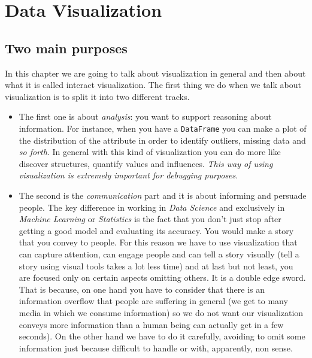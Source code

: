 

\section{Data Visualization}
\subsection{Two main purposes}

In this chapter we are going to talk about visualization in general and then about what it is called interact visualization. The first thing we do when we talk about visualization is to split it into two different tracks. 

\begin{itemize}
\item {The first one is about \emph{analysis}: you want to support reasoning about information. For instance, when you have a \texttt{DataFrame} you can make a plot of the distribution of the attribute in order to identify outliers, missing data and \emph{so forth}. In general with this kind of visualization you can do more like discover structures, quantify values and influences.
\emph{This way of using visualization is extremely important for debugging purposes}.}

\item{The second  is the \emph{communication} part and it is about informing and persuade people.  The key difference in working in \emph{Data Science} and exclusively in \emph{Machine Learning} or \emph{Statistics} is the fact that you don't just stop after getting a good model and evaluating its accuracy. You would make a story that you convey to people.
For this reason we have to use visualization that can capture attention, can engage people and can tell a story visually (tell a story using visual tools takes a lot less time) and at last but not least, you are focused only on certain aspects omitting others. It is a double edge sword. That is because, on one hand you have to consider that there is an information overflow that people are suffering in general (we get to many media in which we consume information) so we do not want our visualization conveys more information than  a human being can actually get in a few seconds). On the other hand we have to do it carefully, avoiding to omit some information just because difficult to handle or with, apparently, non sense.}
\end{itemize}

